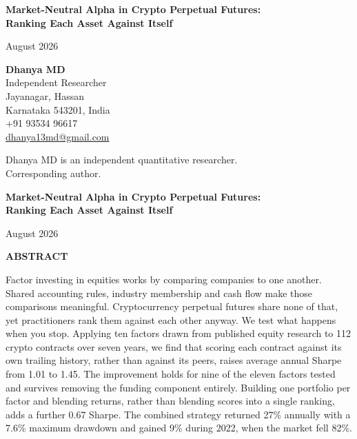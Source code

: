 \documentclass[12pt]{article}
\begin{document}
\thispagestyle{empty}
\vspace*{1in}
\begin{center}
{\large\bfseries Market-Neutral Alpha in Crypto Perpetual Futures:\\
Ranking Each Asset Against Itself}

\vspace{24pt}
August 2026

\vspace{36pt}
\textbf{Dhanya MD}\\
Independent Researcher\\
Jayanagar, Hassan\\
Karnataka 543201, India\\
+91 93534 96617\\
\href{mailto:dhanya13md@gmail.com}{dhanya13md@gmail.com}

\vspace{24pt}
\begin{minipage}{0.8\textwidth}\centering
Dhanya MD is an independent quantitative researcher.\\
Corresponding author.
\end{minipage}
\end{center}

\newpage

\thispagestyle{empty}
\begin{center}
{\large\bfseries Market-Neutral Alpha in Crypto Perpetual Futures:\\
Ranking Each Asset Against Itself}

\vspace{12pt}
August 2026
\end{center}

\vspace{12pt}
\noindent\textbf{ABSTRACT}

\noindent Factor investing in equities works by comparing companies to one
another. Shared accounting rules, industry membership and cash flow make those
comparisons meaningful. Cryptocurrency perpetual futures share none of that, yet
practitioners rank them against each other anyway. We test what happens when you
stop. Applying ten factors drawn from published equity research to 112 crypto
contracts over seven years, we find that scoring each contract against its own
trailing history, rather than against its peers, raises average annual Sharpe
from 1.01 to 1.45. The improvement holds for nine of the eleven factors tested
and survives removing the funding component entirely. Building one portfolio per
factor and blending returns, rather than blending scores into a single ranking,
adds a further 0.67 Sharpe. The combined strategy returned 27\% annually with a
7.6\% maximum drawdown and gained 9\% during 2022, when the market fell 82\%.
\end{document}
